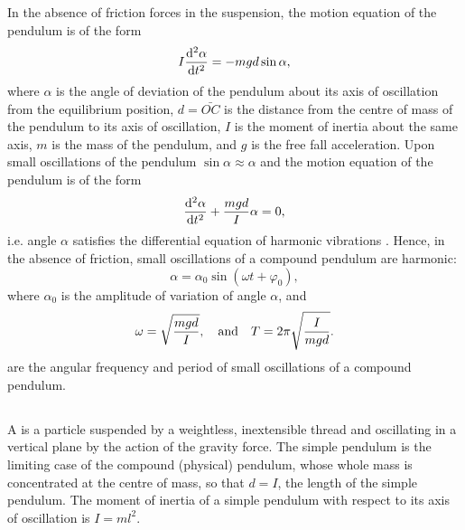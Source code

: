 In the absence of friction forces in the suspension, the motion equation of the pendulum is of the form 
\begin{equation*}%
I \dv[2]{\alpha}{t} = -mgd \sin \alpha,
\end{equation*}
where $\alpha$ is the angle of deviation of the pendulum about its axis of oscillation from the equilibrium position, $d = \bar{OC}$ is the distance from the centre of mass of the pendulum to its axis of oscillation, $I$ is the moment of inertia  about the same axis, $m$ is the mass of the pendulum, and $g$ is the free fall acceleration. Upon small oscillations of the pendulum $\sin \alpha \approx \alpha$ and the motion equation of the pendulum is of the form
\begin{equation*}%
\dv[2]{\alpha}{t} + \frac{mgd}{I} \alpha= 0,
\end{equation*}
i.e. angle $\alpha$ satisfies the differential equation of harmonic vibrations . Hence, in the absence of friction, small oscillations of a compound pendulum are harmonic:
\begin{equation*}%
\alpha = \alpha_{0} \sin (\omega t + \varphi_{0}),
\end{equation*}
where $\alpha_{0}$ is the amplitude of variation of angle $\alpha$, and
\begin{equation*}%
\omega = \sqrt{\frac{mgd}{I}}, \qand T = 2 \pi \sqrt{\frac{I}{mgd}}.
\end{equation*}
are the angular frequency and period of small oscillations of a compound pendulum.

\subsection{}\label{28.2.5}  A  is a particle suspended by a weightless, inextensible thread and oscillating in a vertical plane by the action of the gravity force. The simple pendulum is the limiting case of the compound (physical) pendulum, whose whole mass is concentrated at the centre of mass, so that $d = I$, the length of the simple pendulum. The moment of inertia of a simple pendulum with respect to its axis of oscillation is $I = ml^{2}$. 

